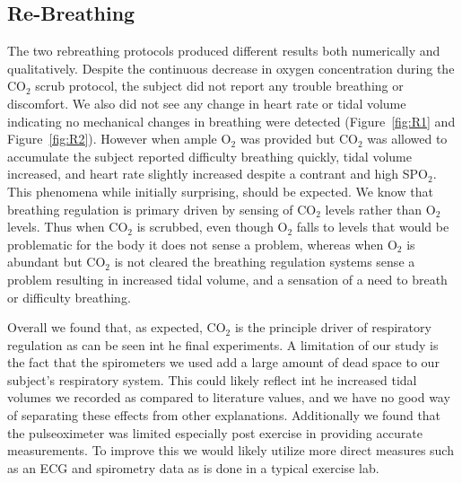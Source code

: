\documentclass[12pt]{article}
\newcommand{\coo}{CO$_2$}
\newcommand{\oo}{O$_2$}
\newcommand{\spo}{SPO$_2$}
\begin{document}
\subsection{Re-Breathing}
The two rebreathing protocols produced different results both numerically and qualitatively. Despite the continuous decrease in oxygen concentration during the \coo{} scrub protocol, the subject did not report any trouble breathing or discomfort. We also did not see any change in heart rate or tidal volume indicating no mechanical changes in breathing were detected (Figure~\ref{fig:R1} and Figure~\ref{fig:R2}). However when ample \oo{} was provided but \coo{} was allowed to accumulate the subject reported difficulty breathing quickly, tidal volume increased, and heart rate slightly increased despite a contrant and high \spo. This phenomena while initially surprising, should be expected. We know that breathing regulation is primary driven by sensing of \coo{} levels rather than \oo{} levels. Thus when \coo{} is scrubbed, even though \oo{} falls to levels that would be problematic for the body it does not sense a problem, whereas when \oo{} is abundant but \coo{} is not cleared the breathing regulation systems sense a problem resulting in increased tidal volume, and a sensation of a need to breath or difficulty breathing.

Overall we found that, as expected, \coo{} is the principle driver of respiratory regulation as can be seen int he final experiments. A limitation of our study is the fact that the spirometers we used add a large amount of dead space to our subject's respiratory system. This could likely reflect int he increased tidal volumes we recorded as compared to literature values, and we have no good way of separating these effects from other explanations. Additionally we found that the pulseoximeter was limited especially post exercise in providing accurate measurements. To improve this we would likely utilize more direct measures such as an ECG and spirometry data as is done in a typical exercise lab.


%
%
\end{document}
